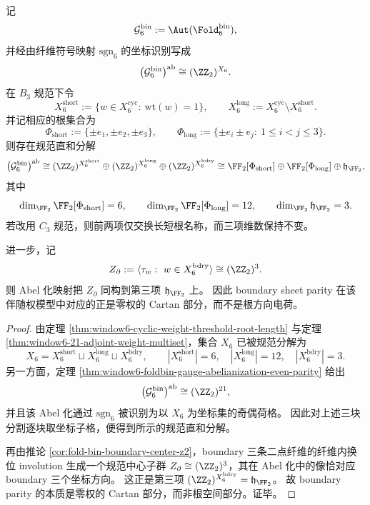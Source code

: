 



\begin{theorem}\label{thm:window6-abelianized-parity-charge-root-cartan-splitting}
记
\[
\mathcal G_6^{\mathrm{bin}}:=\Aut(\Fold_6^{\mathrm{bin}}),
\]
并经由纤维符号映射 \(\mathrm{sgn}_6\) 的坐标识别写成
\[
\bigl(\mathcal G_6^{\mathrm{bin}}\bigr)^{\mathrm{ab}}\cong (\ZZ_2)^{X_6}.
\]
在 \(B_3\) 规范下令
\[
X_6^{\mathrm{short}}:=\{w\in X_6^{\mathrm{cyc}}:\ \mathrm{wt}(w)=1\},
\qquad
X_6^{\mathrm{long}}:=X_6^{\mathrm{cyc}}\setminus X_6^{\mathrm{short}}.
\]
并记相应的根集合为
\[
\Phi_{\mathrm{short}}:=\{\pm e_1,\pm e_2,\pm e_3\},
\qquad
\Phi_{\mathrm{long}}:=\{\pm e_i\pm e_j:\ 1\le i<j\le 3\}.
\]
则存在规范直和分解
\[
\bigl(\mathcal G_6^{\mathrm{bin}}\bigr)^{\mathrm{ab}}
\cong
(\ZZ_2)^{X_6^{\mathrm{short}}}
\oplus
(\ZZ_2)^{X_6^{\mathrm{long}}}
\oplus
(\ZZ_2)^{X_6^{\mathrm{bdry}}}
\cong
\FF_2[\Phi_{\mathrm{short}}]
\oplus
\FF_2[\Phi_{\mathrm{long}}]
\oplus
\mathfrak h_{\FF_2},
\]
其中
\[
\dim_{\FF_2}\FF_2[\Phi_{\mathrm{short}}]=6,\qquad
\dim_{\FF_2}\FF_2[\Phi_{\mathrm{long}}]=12,\qquad
\dim_{\FF_2}\mathfrak h_{\FF_2}=3.
\]
若改用 \(C_3\) 规范，则前两项仅交换长短根名称，而三项维数保持不变。

进一步，记
\[
Z_{\partial}:=\langle \tau_w:\ w\in X_6^{\mathrm{bdry}}\rangle\cong (\ZZ_2)^3.
\]
则 Abel 化映射把 \(Z_{\partial}\) 同构到第三项 \(\mathfrak h_{\FF_2}\) 上。
因此 boundary sheet parity 在该伴随权模型中对应的正是零权的 Cartan 部分，而不是根方向电荷。
\end{theorem}
\begin{proof}
由定理 \ref{thm:window6-cyclic-weight-threshold-root-length} 与定理 \ref{thm:window6-21-adjoint-weight-multiset}，集合 \(X_6\) 已被规范分解为
\[
X_6=X_6^{\mathrm{short}}\sqcup X_6^{\mathrm{long}}\sqcup X_6^{\mathrm{bdry}},
\qquad
|X_6^{\mathrm{short}}|=6,\quad |X_6^{\mathrm{long}}|=12,\quad |X_6^{\mathrm{bdry}}|=3.
\]
另一方面，定理 \ref{thm:window6-foldbin-gauge-abelianization-even-parity} 给出
\[
\bigl(\mathcal G_6^{\mathrm{bin}}\bigr)^{\mathrm{ab}}\cong (\ZZ_2)^{21},
\]
并且该 Abel 化通过 \(\mathrm{sgn}_6\) 被识别为以 \(X_6\) 为坐标集的奇偶荷格。
因此对上述三块分割逐块取坐标子格，便得到所示的规范直和分解。

再由推论 \ref{cor:fold-bin-boundary-center-z2}，boundary 三条二点纤维的纤维内换位 involution 生成一个规范中心子群
\(
Z_{\partial}\cong(\ZZ_2)^3
\)，其在 Abel 化中的像恰对应 boundary 三个坐标方向。
这正是第三项 \((\ZZ_2)^{X_6^{\mathrm{bdry}}}=\mathfrak h_{\FF_2}\)。
故 boundary parity 的本质是零权的 Cartan 部分，而非根空间部分。证毕。
\end{proof}

